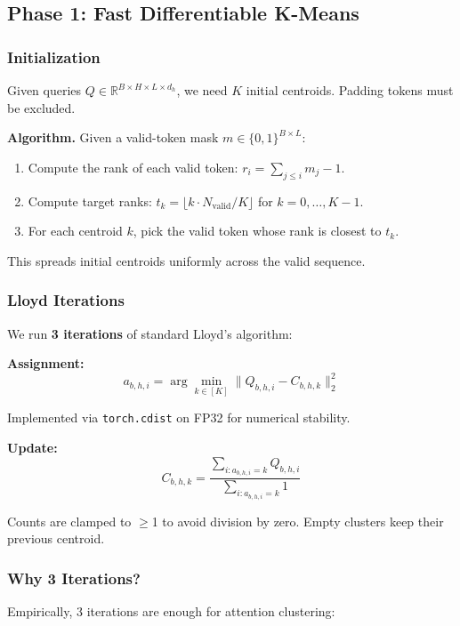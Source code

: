 \subsection{Phase 1: Fast Differentiable K-Means}

\subsubsection{Initialization}

Given queries $Q \in \mathbb{R}^{B \times H \times L \times d_h}$, we need 
$K$ initial centroids. Padding tokens must be excluded.

\textbf{Algorithm.} Given a valid-token mask $m \in \{0, 1\}^{B \times L}$:

\begin{enumerate}
\item Compute the rank of each valid token: $r_i = \sum_{j \leq i} m_j - 1$.
\item Compute target ranks: $t_k = \lfloor k \cdot N_\text{valid} / K \rfloor$
  for $k = 0, \dots, K-1$.
\item For each centroid $k$, pick the valid token whose rank is closest to $t_k$.

\end{enumerate}
This spreads initial centroids uniformly across the valid sequence.

\subsubsection{Lloyd Iterations}

We run \textbf{3 iterations} of standard Lloyd's algorithm:

\textbf{Assignment:}
\[
a_{b,h,i} = \arg\min_{k \in [K]} \|Q_{b,h,i} - C_{b,h,k}\|_2^2
\]

Implemented via \texttt{torch.cdist} on FP32 for numerical stability.

\textbf{Update:}
\[
C_{b,h,k} = \frac{\sum_{i: a_{b,h,i} = k} Q_{b,h,i}}{\sum_{i: a_{b,h,i} = k} 1}
\]

Counts are clamped to $\ge$1 to avoid division by zero. Empty clusters keep 
their previous centroid.

\subsubsection{Why 3 Iterations?}

Empirically, 3 iterations are enough for attention clustering:

